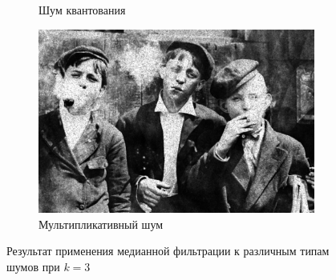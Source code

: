 \begin{figure}[ht!]
\begin{subfigure}[b]{0.5\linewidth}
      \caption{Шум квантования} 
      \label{median_3:e}
    \end{subfigure}%
    \begin{subfigure}[b]{0.5\linewidth}
        \centering
        \includegraphics[width=0.95\linewidth]{../Median_FIlter/Median_Speckle_noise_(k=3).jpg} 
        \caption{Мультипликативный шум} 
        \label{median_3:f} 
    \end{subfigure} 
    \caption{Результат применения медианной фильтрации к различным типам шумов при $k = 3$}
    \label{img:median_3} 
\end{figure}

